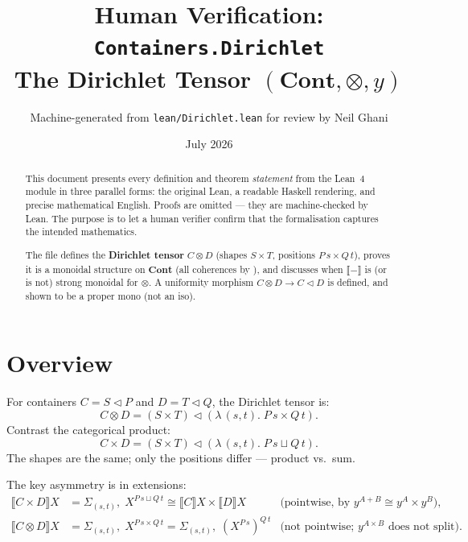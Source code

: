 \documentclass[11pt,a4paper]{article}
\title{Human Verification: \texttt{Containers.Dirichlet}\\[4pt]
  \large The Dirichlet Tensor $(\mathbf{Cont}, \otimes, y)$}
\author{Machine-generated from \texttt{lean/Dirichlet.lean} for review by Neil Ghani}
\date{July 2026}
\begin{document}
\maketitle

\begin{abstract}
This document presents every definition and theorem \emph{statement} from the
Lean~4 module  in three parallel forms: the original
Lean, a readable Haskell rendering, and precise mathematical English.  Proofs
are omitted --- they are machine-checked by Lean.  The purpose is to let a
human verifier confirm that the formalisation captures the intended
mathematics.

The file defines the \textbf{Dirichlet tensor} $C \otimes D$ (shapes $S \times T$,
positions $P\,s \times Q\,t$), proves it is a monoidal structure on $\mathbf{Cont}$
(all coherences by ), and discusses when $\llbracket{-}\rrbracket$ is
(or is not) strong monoidal for $\otimes$.  A uniformity morphism $C \otimes D
\to C \triangleleft D$ is defined, and shown to be a proper mono (not an iso).
\end{abstract}

\tableofcontents
\bigskip

\section{Overview}

For containers $C = S \triangleleft P$ and $D = T \triangleleft Q$, the Dirichlet
tensor is:
\[
  C \otimes D = (S \times T) \triangleleft (\lambda\,(s,t).\; P\,s \times Q\,t).
\]
Contrast the categorical product:
\[
  C \times D = (S \times T) \triangleleft (\lambda\,(s,t).\; P\,s \sqcup Q\,t).
\]
The shapes are the same; only the positions differ --- product vs.\ sum.

The key asymmetry is in extensions:
\begin{align*}
  \llbracket C \times D \rrbracket X
    &= \textstyle\Sigma_{(s,t)},\; X^{P\,s \sqcup Q\,t}
     \cong \llbracket C \rrbracket X \times \llbracket D \rrbracket X
    &\text{(pointwise, by } y^{A+B} \cong y^A \times y^B), \\
  \llbracket C \otimes D \rrbracket X
    &= \textstyle\Sigma_{(s,t)},\; X^{P\,s \times Q\,t}
     = \textstyle\Sigma_{(s,t)},\; (X^{P\,s})^{Q\,t}
    &\text{(not pointwise; } y^{A \times B} \text{ does not split)}.
\end{align*}
\end{document}
